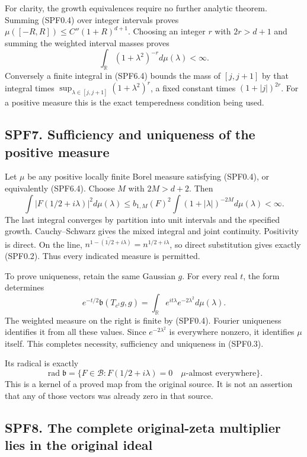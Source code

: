 For clarity, the growth equivalences require no further analytic
theorem. Summing (SPF0.4) over integer intervals proves
\(\mu([-R,R])\le C''(1+R)^{d+1}\). Choosing an integer \(r\) with
\(2r>d+1\) and summing the weighted interval masses proves \[
\int_{\mathbb R}(1+\lambda^2)^{-r}d\mu(\lambda)<\infty.
\tag{SPF6.4}
\] Conversely a finite integral in (SPF6.4) bounds the mass of
\([j,j+1]\) by that integral times
\(\sup_{\lambda\in[j,j+1]}(1+\lambda^2)^r\), a fixed constant times
\((1+|j|)^{2r}\). For a positive measure this is the exact temperedness
condition being used.

\subsection{SPF7. Sufficiency and uniqueness of the positive
measure}\label{spf7.-sufficiency-and-uniqueness-of-the-positive-measure}

Let \(\mu\) be any positive locally finite Borel measure satisfying
(SPF0.4), or equivalently (SPF6.4). Choose \(M\) with \(2M>d+2\). Then
\[
\int |F(1/2+i\lambda)|^2d\mu(\lambda)
\le b_{1,M}(F)^2
\int(1+|\lambda|)^{-2M}d\mu(\lambda)<\infty.
\tag{SPF7.1}
\] The last integral converges by partition into unit intervals and the
specified growth. Cauchy--Schwarz gives the mixed integral and joint
continuity. Positivity is direct. On the line,
\(\overline{n^{1-(1/2+i\lambda)}}=n^{1/2+i\lambda}\), so direct
substitution gives exactly (SPF0.2). Thus every indicated measure is
permitted.

To prove uniqueness, retain the same Gaussian \(g\). For every real
\(t\), the form determines \[
e^{-t/2}\mathfrak b(T_{e^t}g,g)
=\int_{\mathbb R}e^{it\lambda}e^{-2\lambda^2}d\mu(\lambda).
\tag{SPF7.2}
\] The weighted measure on the right is finite by (SPF0.4). Fourier
uniqueness identifies it from all these values. Since
\(e^{-2\lambda^2}\) is everywhere nonzero, it identifies \(\mu\) itself.
This completes necessity, sufficiency and uniqueness in (SPF0.3).

Its radical is exactly \[
\operatorname{rad}\mathfrak b
=\{F\in\mathcal B:F(1/2+i\lambda)=0\quad\mu\text{-almost everywhere}\}.
\tag{SPF7.3}
\] This is a kernel of a proved map from the original source. It is not
an assertion that any of those vectors was already zero in that source.

\subsection{SPF8. The complete original-zeta multiplier lies in the
original
ideal}\label{spf8.-the-complete-original-zeta-multiplier-lies-in-the-original-ideal}

